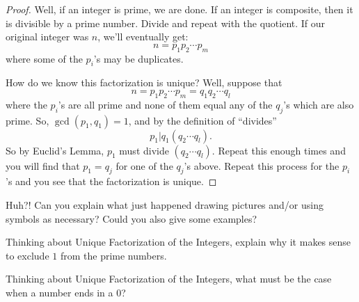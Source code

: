 \begin{proof}
Well, if an integer is prime, we are done. If an integer is composite,
then it is divisible by a prime number. Divide and repeat with the
quotient. If our original integer was $n$, we'll eventually get:
\[
n = p_1p_2 \cdots p_m
\]
where some of the $p_i$'s may be duplicates. 

How do we know this factorization is unique? Well, suppose that
\[
n = p_1p_2 \cdots p_m = q_1q_2\cdots q_l
\]
where the $p_i$'s are all prime and none of them equal any of the
$q_j$'s which are also prime. So, $\gcd(p_1,q_1) = 1$, and by the
definition of ``divides''
\[
p_1 |q_1(q_2\cdots q_l).
\]
So by Euclid's Lemma, $p_1$ must divide $(q_2\cdots q_l)$. Repeat this
enough times and you will find that $p_1 = q_j$ for one of the $q_j$'s
above. Repeat this process for the $p_i$'s and you see that the
factorization is unique.
\end{proof}

\begin{question} 
Huh?! Can you explain what just happened drawing pictures and/or using
symbols as necessary? Could you also give some examples?
\end{question}
\QM

\begin{question} 
Thinking about Unique Factorization of the Integers, explain why it
makes sense to exclude $1$ from the prime numbers.
\end{question}
\QM


\begin{question} 
Thinking about Unique Factorization of the Integers, what must be the
case when a number ends in a $0$?
\end{question}
\QM



\newpage

